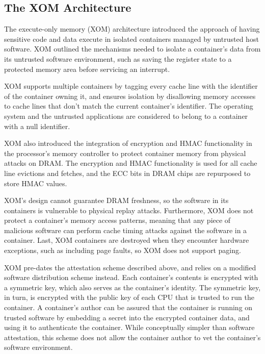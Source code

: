 \subsection{The XOM Architecture}

The execute-only memory (XOM) architecture \cite{lie2000xom} introduced the
approach of having sensitive code and data execute in isolated containers
managed by untrusted host software. XOM outlined the mechanisms needed to
isolate a container's data from its untrusted software environment, such as
saving the register state to a protected memory area before servicing an
interrupt.

XOM supports multiple containers by tagging every cache line with the
identifier of the container owning it, and ensures isolation by disallowing
memory accesses to cache lines that don't match the current container's
identifier. The operating system and the untrusted applications are considered
to belong to a container with a null identifier.

XOM also introduced the integration of encryption and HMAC functionality in
the processor's memory controller to protect container memory from physical
attacks on DRAM. The encryption and HMAC functionality is used for all cache
line evictions and fetches, and the ECC bits in DRAM chips are repurposed to
store HMAC values.

XOM's design cannot guarantee DRAM freshness, so the software in its containers
is vulnerable to physical replay attacks. Furthermore, XOM does not protect a
container's memory access patterns, meaning that any piece of malicious
software can perform cache timing attacks against the software in a container.
Last, XOM containers are destroyed when they encounter hardware exceptions,
such as including page faults, so XOM does not support paging.

XOM pre-dates the attestation scheme described above, and relies on a modified
software distribution scheme instead. Each container's contents is encrypted
with a symmetric key, which also serves as the container's identity. The
symmetric key, in turn, is encrypted with the public key of each CPU that is
trusted to run the container. A container's author can be assured that the
container is running on trusted software by embedding a secret into the
encrypted container data, and using it to authenticate the container. While
conceptually simpler than software attestation, this scheme does not allow the
container author to vet the container's software environment.
